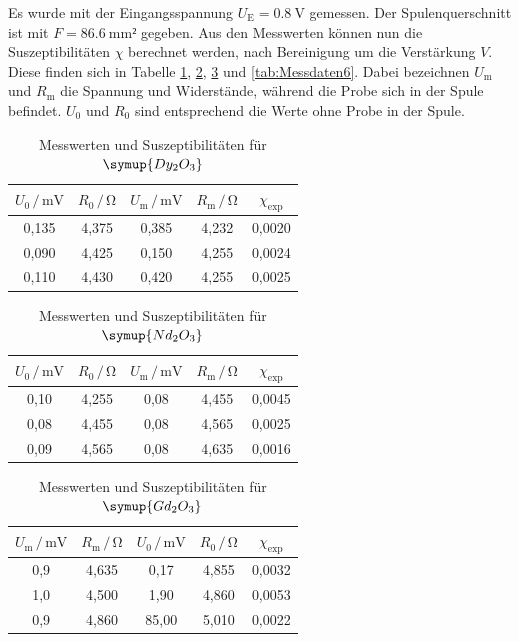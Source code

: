 Es wurde mit der Eingangsspannung $U_\text{E} = \SI{0.8}{\volt}$ gemessen. Der 
Spulenquerschnitt ist mit $F = \SI{86.6}{\milli\meter²}$ gegeben. Aus den Messwerten 
können nun die Suszeptibilitäten $\chi$ berechnet werden, nach Bereinigung 
um die Verstärkung $V$. Diese finden sich in Tabelle \ref{tab:Messdaten3}, 
\ref{tab:Messdaten4}, \ref{tab:Messdaten5} und \ref{tab:Messdaten6}.
Dabei bezeichnen $U_\text{m}$ und $R_\text{m}$ die Spannung und Widerstände, 
während die Probe sich in der Spule befindet. $U_\text{0}$ und $R_\text{0}$
sind entsprechend die Werte ohne Probe in der Spule. 

\begin{table}
\centering
\caption{Messwerten und Suszeptibilitäten für $\symup{Dy_2O_3}$}
\label{tab:Messdaten3}
\begin{tabular}{c c c c c}
\toprule
$U_\text{0} \,/\, \si{\milli\volt}$ & $R_\text{0} \,/\, \si{\ohm}$ & $U_\text{m} \,/\, \si{\milli\volt}$& $R_\text{m} \,/\, \si{\ohm}$ & $\chi _\text{exp}$ \\
\midrule
0,135 & 4,375 & 0,385 & 4,232 & 0,0020\\
0,090 & 4,425 & 0,150 & 4,255 & 0,0024\\
0,110 & 4,430 & 0,420 & 4,255 & 0,0025\\ 
\bottomrule
\end{tabular}
\end{table}

\begin{table}
\centering
\caption{Messwerten und Suszeptibilitäten für $\symup{Nd_2O_3}$}
\label{tab:Messdaten4}
\begin{tabular}{c c c c c}
\toprule
$U_\text{0} \,/\, \si{\milli\volt}$ & $R_\text{0} \,/\, \si{\ohm}$ & $U_\text{m} \,/\, \si{\milli\volt}$& $R_\text{m} \,/\, \si{\ohm}$ & $\chi _\text{exp}$ \\
\midrule
0,10 & 4,255 & 0,08 & 4,455 & 0,0045\\
0,08 & 4,455 & 0,08 & 4,565 & 0,0025\\
0,09 & 4,565 & 0,08 & 4,635 & 0,0016\\
\bottomrule
\end{tabular}
\end{table}

\begin{table}
\centering
\caption{Messwerten und Suszeptibilitäten für $\symup{Gd_2O_3}$}
\label{tab:Messdaten5}
\begin{tabular}{c c c c c}
\toprule
$U_\text{m} \,/\, \si{\milli\volt}$ & $R_\text{m} \,/\, \si{\ohm}$ & $U_\text{0} \,/\, \si{\milli\volt}$& $R_\text{0} \,/\, \si{\ohm}$ & $\chi _\text{exp}$ \\
\midrule
0,9 & 4,635 &  0,17 & 4,855 & 0,0032\\
1,0 & 4,500 &  1,90 & 4,860 & 0,0053\\
0,9 & 4,860 & 85,00 & 5,010 & 0,0022\\
\bottomrule
\end{tabular}
\end{table}

